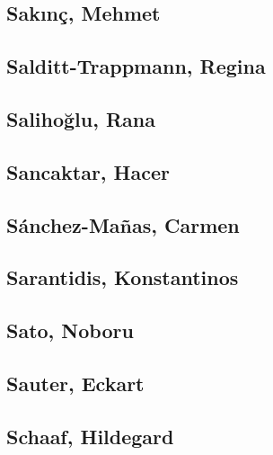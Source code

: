 \subsection[Sakınç, Mehmet (1)]{Sakınç, Mehmet}

\subsection[Salditt-Trappmann, Regina (1)]{Salditt-Trappmann, Regina}

\subsection[Salihoğlu, Rana (1)]{Salihoğlu, Rana}

\subsection[Sancaktar, Hacer (1)]{Sancaktar, Hacer}

\subsection[Sánchez-Mañas, Carmen (1)]{Sánchez-Mañas, Carmen}

\subsection[Sarantidis, Konstantinos (2)]{Sarantidis, Konstantinos}


\subsection[Sato, Noboru (1)]{Sato, Noboru}

\subsection[Sauter, Eckart (1)]{Sauter, Eckart}

\subsection[Schaaf, Hildegard (1)]{Schaaf, Hildegard}

